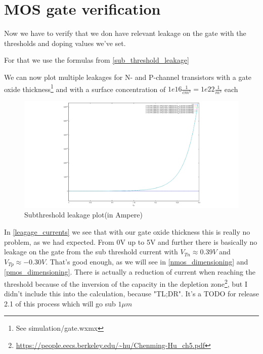 \section{MOS gate verification}\label{gate_verify}
Now we have to verify that we don have relevant leakage on the gate with the thresholds and doping values we've set.

For that we use the formulas from \autoref{sub_threshold_leakage}

We can now plot multiple leakages for N- and P-channel transistors with a gate oxide thickness\footnote{See simulation/gate.wxmx} and with a surface concentration of $1e16\frac{1}{cm^3}=1e22\frac{1}{m^3}$ each
\begin{figure}[H]
	\centering
	\includegraphics[width=\textwidth]{subthreshold_leagage.png}
	\caption{Subthreshold leakage plot(in Ampere)}
	\label{leagage_currents}
\end{figure}
In \autoref{leagage_currents} we see that with our gate oxide thickness this is really no problem, as we had expected.
From 0V up to 5V and further there is basically no leakage on the gate from the sub threshold current with $V_{Tn} \approx 0.39V$ and $V_{Tp} \approx -0.30V$.
That's good enough, as we will see in \autoref{nmos_dimensioning} and \autoref{pmos_dimensioning}.
There is actually a reduction of current when reaching the threshold because of the inversion of the capacity in the depletion zone\footnote{\url{https://people.eecs.berkeley.edu/~hu/Chenming-Hu_ch5.pdf}}, but I didn't include this into the calculation, because "TL;DR".
It's a TODO for release 2.1 of this process which will go sub $1 \mu m$